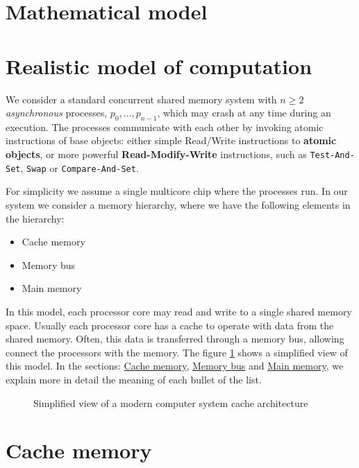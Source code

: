 \documentclass[openany, a4paper]{book}
\theoremstyle{break}
\theoremstyle{example}
\theoremstyle{note}
\theoremstyle{break}
\theoremstyle{exercise}
\begin{document}
\section{Mathematical model}
\label{sec:org2a66d13}


\section{Realistic model of computation}
\label{sec:orgae3ae8f}

We consider a standard concurrent shared memory system with \(n \ge 2\)
\emph{asynchronous} processes, \(p_0, \ldots, p_{n-1}\), which may crash at any time
during an execution. The processes communicate with each other by invoking
atomic instructions of base objects: either simple Read/Write instructions to
\textbf{atomic objects}, or more powerful \textbf{Read-Modify-Write} instructions, such as
\texttt{Test-And-Set}, \texttt{Swap} or \texttt{Compare-And-Set}.

For simplicity we assume a single multicore chip where the processes run. In
our system we consider a memory hierarchy, where we have the following
elements in the hierarchy:

\begin{itemize}
\item Cache memory
\item Memory bus
\item Main memory
\end{itemize}

In this model, each processor core may read and
write to a single shared memory space. Usually each processor core has a
cache to operate with data from the shared memory. Often, this data is
transferred through a memory bus, allowing connect the processors with the
memory. The figure \ref{fig:arch} shows a simplified view of this model. In
the sections: \hyperref[sec:orgd0812a1]{Cache memory}, \hyperref[sec:org6fddf85]{Memory bus} and \hyperref[sec:org1f977fc]{Main memory}, we explain more in
detail the meaning of each bullet of the list.

\begin{figure}
\begin{minipage}{\linewidth}
  
\end{minipage}
\caption{Simplified view of a modern computer system cache architecture}
\label{fig:arch}
\end{figure}


\section{Cache memory}
\label{sec:orgd0812a1}
\end{document}
